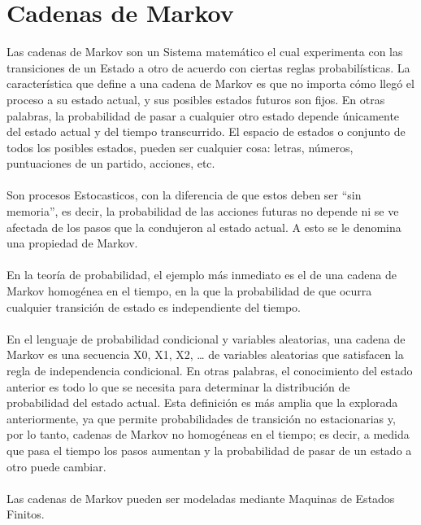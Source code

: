 \documentclass[12pt, a4paper, titlepage]{report}
\begin{document}
		\newpage
		
		\section{Cadenas de Markov}
	    Las cadenas de Markov son un \gls{Sistema} matemático el cual experimenta con las transiciones de un \gls{Estado} a otro de acuerdo con ciertas reglas probabilísticas. La característica que define a una cadena de Markov es que no importa cómo llegó el proceso a su estado actual, y sus posibles estados futuros son fijos. En otras palabras, la probabilidad de pasar a cualquier otro estado depende únicamente del estado actual y del tiempo transcurrido. El espacio de estados o conjunto de todos los posibles estados, pueden ser cualquier cosa: letras, números, puntuaciones de un partido, acciones, etc.\\\\
		Son procesos \gls{Estocastico}s, con la diferencia de que estos deben ser “sin memoria”, es decir, la probabilidad de las acciones futuras no depende ni se ve afectada de los pasos que la condujeron al estado actual. A esto se le denomina una propiedad de Markov.\\\\
		En la teoría de probabilidad, el ejemplo más inmediato es el de una cadena de Markov homogénea en el tiempo, en la que la probabilidad de que ocurra cualquier transición de estado es independiente del tiempo.\\\\
		En el lenguaje de probabilidad condicional y variables aleatorias, una cadena de Markov es una secuencia X0, X1, X2, … de variables aleatorias que satisfacen la regla de independencia condicional.
		En otras palabras, el conocimiento del estado anterior es todo lo que se necesita para determinar la distribución de probabilidad del estado actual. Esta definición es más amplia que la explorada anteriormente, ya que permite probabilidades de transición no estacionarias y, por lo tanto, cadenas de Markov no homogéneas en el tiempo; es decir, a medida que pasa el tiempo los pasos aumentan y la probabilidad de pasar de un estado a otro puede cambiar. \cite{refMarkov}\\\\
		Las cadenas de Markov pueden ser modeladas mediante \gls{Maquinas de Estados Finitos}.\par
\end{document}
